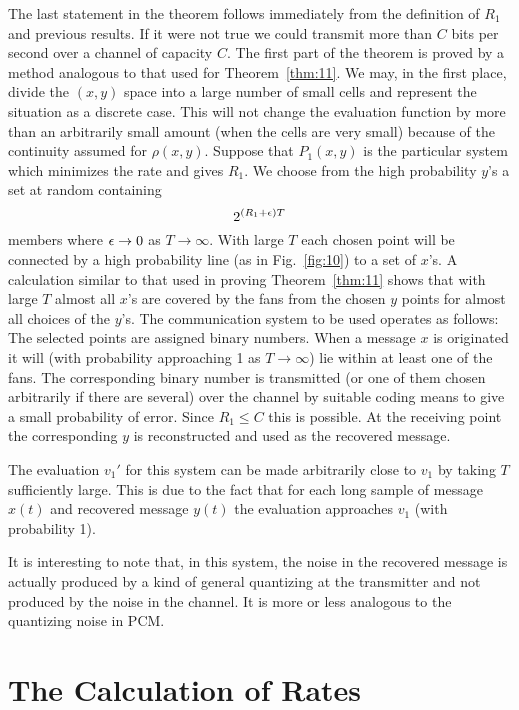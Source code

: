 The last statement in the theorem follows immediately from the definition
of $R_1$ and previous results.  If it were not true we could transmit more
than $C$ bits per second over a channel of capacity $C$.  The first part
of the theorem is proved by a method analogous to that used for
Theorem~\ref{thm:11}.  We may, in the first place, divide the $(x,y)$ space
into a large number of small cells and represent the situation as a
discrete case.  This will not change the evaluation function by more than
an arbitrarily small amount (when the cells are very small) because of the
continuity assumed for $\rho(x,y)$.  Suppose that $P_1(x,y)$ is the
particular system which minimizes the rate and gives $R_1$.  We choose from
the high probability $y$'s a set at random containing
$$
2^{(R_1+\epsilon)T}
$$
members where $\epsilon\to0$ as $T\to\infty$.  With large $T$ each chosen point
will be connected by a high probability line (as in Fig.~\ref{fig:10}) to a
set of $x$'s.  A calculation similar to that used in proving
Theorem~\ref{thm:11} shows that with large $T$ almost all $x$'s are covered
by the fans from the chosen $y$ points for almost all choices of the $y$'s.
The communication system to be used operates as follows: The
selected points are assigned binary numbers.  When a message $x$ is
originated it will (with probability approaching 1 as $T\to\infty$) lie
within at least one of the fans.  The corresponding binary number is
transmitted (or one of them chosen arbitrarily if there are several) over
the channel by suitable coding means to give a small probability of error.
Since $R_1\leq C$ this is possible.  At the receiving point the
corresponding $y$ is reconstructed and used as the recovered message.

The evaluation $v_1'$ for this system can be made arbitrarily close to
$v_1$ by taking $T$ sufficiently large.  This is due to the fact that for
each long sample of message $x(t)$ and recovered message $y(t)$ the
evaluation approaches $v_1$ (with probability 1).

It is interesting to note that, in this system, the noise in the recovered
message is actually produced by a kind of general quantizing at the
transmitter and not produced by the noise in the channel.  It is more or
less analogous to the quantizing noise in PCM.

\section{The Calculation of Rates}


